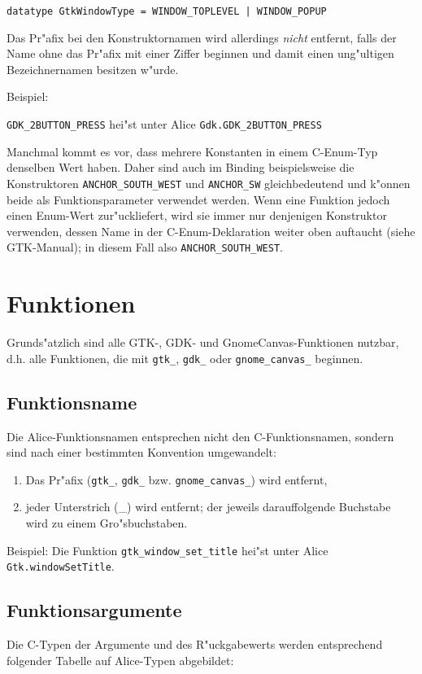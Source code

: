 \documentclass{article}
\begin{document}
\texttt{datatype GtkWindowType = WINDOW\_TOPLEVEL | WINDOW\_POPUP}

Das Pr"afix bei den Konstruktornamen wird allerdings \textit{nicht} entfernt,
falls der Name ohne das Pr"afix mit einer Ziffer beginnen und damit
einen ung"ultigen Bezeichnernamen besitzen w"urde.

Beispiel:

\texttt{GDK\_2BUTTON\_PRESS} hei"st unter Alice 
  \texttt{Gdk.GDK\_2BUTTON\_PRESS}

Manchmal kommt es vor, dass mehrere Konstanten in einem C-Enum-Typ denselben
Wert haben. Daher sind auch im Binding beispielsweise die Konstruktoren
\texttt{ANCHOR\_SOUTH\_WEST} und \texttt{ANCHOR\_SW} gleichbedeutend
und k"onnen beide als Funktionsparameter verwendet werden. Wenn eine Funktion
jedoch einen Enum-Wert zur"uckliefert, wird sie immer nur denjenigen
Konstruktor verwenden, dessen Name in der C-Enum-Deklaration weiter oben
auftaucht (siehe GTK-Manual); in diesem Fall also \texttt{ANCHOR\_SOUTH\_WEST}.



\section{Funktionen}
Grunds"atzlich sind alle GTK-, GDK- und GnomeCanvas-Funktionen nutzbar, d.h.
alle Funktionen, die mit \texttt{gtk\_}, \texttt{gdk\_} oder
\texttt{gnome\_canvas\_} beginnen.

\subsection{Funktionsname}
Die Alice-Funktionsnamen entsprechen nicht den C-Funktionsnamen, sondern sind
nach einer bestimmten Konvention umgewandelt:
\begin{enumerate}
\item Das Pr"afix (\texttt{gtk\_}, \texttt{gdk\_} bzw. 
      \texttt{gnome\_canvas\_}) wird entfernt,
\item jeder Unterstrich (\_) wird entfernt; der jeweils darauffolgende
      Buchstabe wird zu einem Gro"sbuchstaben.
\end{enumerate}

Beispiel: Die Funktion \texttt{gtk\_window\_set\_title} hei"st unter Alice
\texttt{Gtk.windowSetTitle}.

\subsection{Funktionsargumente}
Die C-Typen der Argumente und des R"uckgabewerts werden entsprechend folgender
Tabelle auf Alice-Typen abgebildet:
\end{document}
